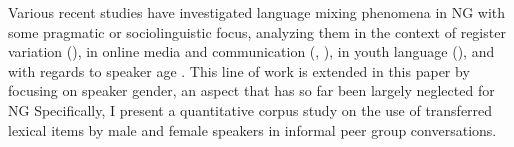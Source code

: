 \documentclass[output=paper]{langsci/langscibook}
\begin{document}

Various recent studies have investigated language mixing phenomena in NG with some pragmatic or sociolinguistic focus, analyzing them in the context of register variation (\citealt{wiese_registerdifferenzierung_2021}), in online media and communication (\citealt{radke_lekker_2017}, ), in youth language (\citealt{kellermeier-rehbein_namslang_2015, kellermeier-rehbein_sprache_2016}), and with regards to speaker age \citep{zimmer_linguisticvar_toappear}. This line of work is extended in this paper by focusing on speaker gender, an aspect that has so far been largely neglected for NG Specifically, I present a quantitative corpus study on the use of transferred lexical items by male and female speakers in informal peer group conversations.

\end{document}
